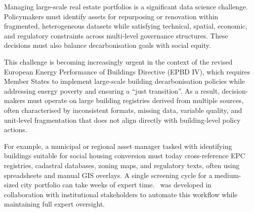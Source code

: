 \documentclass[runningheads,orivec]{llncs}
\begin{document}



Managing large-scale real estate portfolios is a significant data science challenge. Policymakers must identify assets for repurposing or renovation within fragmented, heterogeneous datasets while satisfying technical, spatial, economic, and regulatory constraints across multi-level governance structures. These decisions must also balance decarbonisation goals with social equity.

This challenge is becoming increasingly urgent in the context of the revised European Energy Performance of Buildings Directive (EPBD IV), which requires Member States to implement large-scale building decarbonisation policies while addressing energy poverty and ensuring a ``just transition''. 
As a result, decision-makers must operate on large building registries derived from multiple sources, often characterised by inconsistent formats, missing data, variable quality, and unit-level fragmentation that does not align directly with building-level policy actions.

For example, a municipal or regional asset manager tasked with identifying buildings suitable for social housing conversion must today cross-reference EPC registries, cadastral databases, zoning maps, and regulatory texts, often using spreadsheets and manual GIS overlays. A single screening cycle for a medium-sized city portfolio can take weeks of expert time. \methodACR\ was developed in collaboration with institutional stakeholders to automate this workflow while maintaining full expert oversight.
\end{document}
